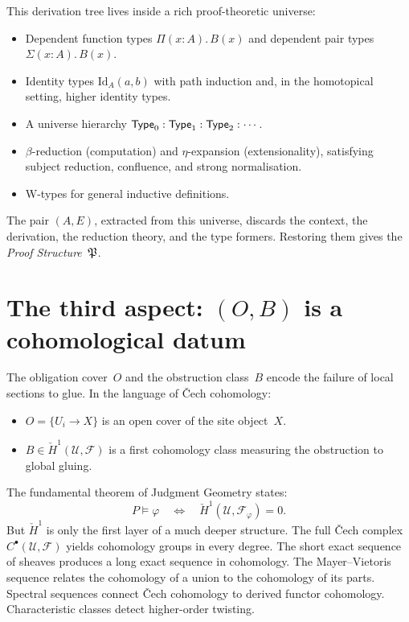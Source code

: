 This derivation tree lives inside a rich proof-theoretic universe:
\begin{itemize}[nosep]
\item Dependent function types $\Pi(x:A).\,B(x)$ and dependent pair
  types $\Sigma(x:A).\,B(x)$.
\item Identity types $\mathrm{Id}_A(a,b)$ with path induction and, in
  the homotopical setting, higher identity types.
\item A universe hierarchy
  $\mathsf{Type}_0 : \mathsf{Type}_1 : \mathsf{Type}_2 : \cdots$.
\item $\beta$-reduction (computation) and $\eta$-expansion
  (extensionality), satisfying subject reduction, confluence, and
  strong normalisation.
\item W-types for general inductive definitions.
\end{itemize}
The pair $(A,E)$, extracted from this universe, discards the context,
the derivation, the reduction theory, and the type formers.  Restoring
them gives the \emph{Proof Structure}~$\mathfrak{P}$.

\section{The third aspect: $(O,B)$ is a cohomological datum}
\label{sec:obs-cohom}

The obligation cover~$O$ and the obstruction class~$B$ encode the
failure of local sections to glue.  In the language of \v{C}ech
cohomology:
\begin{itemize}[nosep]
\item $O = \{U_i \to X\}$ is an open cover of the site object~$X$.
\item $B \in \check{H}^1(\mathcal{U},\mathcal{F})$ is a first
  cohomology class measuring the obstruction to global gluing.
\end{itemize}
The fundamental theorem of Judgment Geometry states:
\[
  P \models \varphi
  \quad\Longleftrightarrow\quad
  \check{H}^1(\mathcal{U},\mathcal{F}_\varphi) = 0.
\]
But $\check{H}^1$ is only the first layer of a much deeper structure.
The full \v{C}ech complex $C^\bullet(\mathcal{U},\mathcal{F})$ yields
cohomology groups in every degree.  The short exact sequence of sheaves
produces a long exact sequence in cohomology.  The Mayer--Vietoris
sequence relates the cohomology of a union to the cohomology of its
parts.  Spectral sequences connect \v{C}ech cohomology to derived
functor cohomology.  Characteristic classes detect higher-order
twisting.

